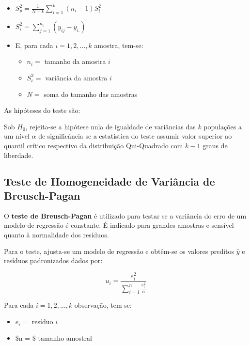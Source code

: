 \documentclass[
  portuguese,
]{estat/estat}
\providecommand{\tightlist}{%
  \setlength{\itemsep}{0pt}\setlength{\parskip}{0pt}}
\begin{document}
\begin{itemize}
\item
  \(\displaystyle S^2_p = \frac{1}{N - k}\sum_{i=1}^{k}(n_i - 1)S^2_i\)
\item
  \(\displaystyle S^2_i = \sum_{j=1}^{n_i}(y_{ij} - \bar{y}_{i.})\)
\item
  E, para cada \(i=1, 2, \ldots, k\) amostra, tem-se:

  \begin{itemize}
  \tightlist
  \item
    \(n_i =\) tamanho da amostra \(i\)
  \item
    \(S^2_i =\) variância da amostra \(i\)
  \item
    \(N =\) soma do tamanho das amostras
  \end{itemize}
\end{itemize}

As hipóteses do teste são:


Sob \(H_0\), rejeita-se a hipótese nula de igualdade de variâncias das
\(k\) populações a um nível \(\alpha\) de significância se a estatística
do teste assumir valor superior ao quantil crítico respectivo da
distribuição Qui-Quadrado com \(k-1\) graus de liberdade.

\subsection{Teste de Homogeneidade de Variância de
Breusch-Pagan}\label{teste-de-homogeneidade-de-variuxe2ncia-de-breusch-pagan}

O \textbf{teste de Breusch-Pagan} é utilizado para testar se a variância
do erro de um modelo de regressão é constante. É indicado para grandes
amostras e sensível quanto à normalidade dos resíduos.

Para o teste, ajusta-se um modelo de regressão e obtêm-se os valores
preditos \(\hat{y}\) e resíduos padronizados dados por:

\[ u_i = \frac{e_i^2}{\displaystyle \sum_{i=1}^n \frac{e_i^2}{n}} \]

Para cada \(i=1, 2, \ldots, k\) observação, tem-se:

\begin{itemize}
\tightlist
\item
  \(e_i =\) resíduo \(i\)
\item
  \$n = \$ tamanho amostral
\end{itemize}
\end{document}
